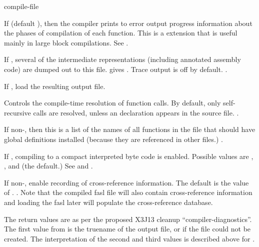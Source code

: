 \begin{defun}{}{compile-file}
\begin{Lentry}
  \item[\kwd{progress}] If \true{} (default \false{}), then the
    compiler prints to error output progress information about the
    phases of compilation of each function.  This is a \cmucl{} extension
    that is useful mainly in large block compilations.  See
    .
    
  \item[\kwd{trace-file}] If \true{}, several of the intermediate
    representations (including annotated assembly code) are dumped out
    to this file.  \true{} gives .  Trace
    output is off by default.  .
    
  \item[\kwd{load}] If \true{}, load the resulting output file.
    
  \item[\kwd{block-compile}] Controls the compile-time resolution of
    function calls.  By default, only self-recursive calls are
    resolved, unless an  declaration appears in
    the source file.  .
    
  \item[\kwd{entry-points}] If non-\nil, then this is a list of the
    names of all functions in the file that should have global
    definitions installed (because they are referenced in other
    files.)  .
    
  \item[\kwd{byte-compile}] If \true{}, compiling to a compact
    interpreted byte code is enabled.  Possible values are \true{},
    \false{}, and  (the default.)  See
     and .

  \item[\kwd{xref}] If non-\nil, enable recording of cross-reference
    information.  The default is the value of
    .  .  Note that the
    compiled fasl file will also contain cross-reference information
    and loading the fasl later will populate the cross-reference database.
  \end{Lentry}
  
  The return values are as per the proposed X3J13 cleanup
  ``compiler-diagnostics''.  The first value from 
  is the truename of the output file, or \false{} if the file could
  not be created.  The interpretation of the second and third values
  is described above for .
\end{defun}

